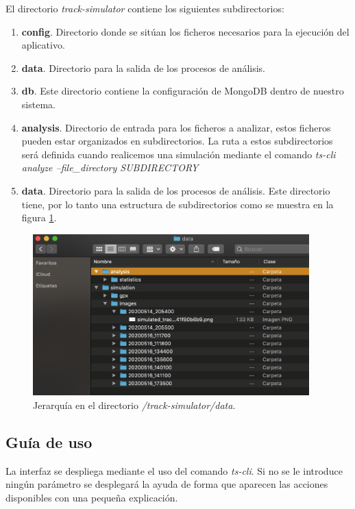El directorio  \textit{track-simulator} contiene los siguientes subdirectorios:
\begin{enumerate}[label={D.\arabic*.}]
\item \textbf{config}. Directorio donde se sitúan los ficheros necesarios para la ejecución del aplicativo.\item \textbf{data}. Directorio para la salida de los procesos de análisis.
\item \textbf{db}. Este directorio contiene la configuración de MongoDB dentro de nuestro sistema.
\item \textbf{analysis}. Directorio de entrada para los ficheros a analizar, estos ficheros pueden estar organizados en subdirectorios. La ruta a estos subdirectorios será definida cuando realicemos una simulación mediante el comando \textit{ts-cli analyze 	--file\_directory \lbrack SUBDIRECTORY\rbrack}
\item \textbf{data}. Directorio para la salida de los procesos de análisis. Este directorio tiene, por lo tanto una estructura de subdirectorios como se muestra en la figura \ref{figure:dataFolderHierarchy}.

\end{enumerate}
\begin{figure}[!htb]
\begin{center}
\includegraphics[width=0.95\textwidth]{./Imagenes/dataFolderHierarchy.png}
\caption{Jerarquía en el directorio \textit{\slash track-simulator\slash data}.}
\end{center}
\label{figure:dataFolderHierarchy}
\end{figure}
\newpage

\subsection{Guía de uso}
La interfaz se despliega mediante el uso del comando \textit{ts-cli}. Si no se le introduce ningún parámetro se desplegará la ayuda de forma que aparecen las  acciones disponibles con una pequeña explicación.

